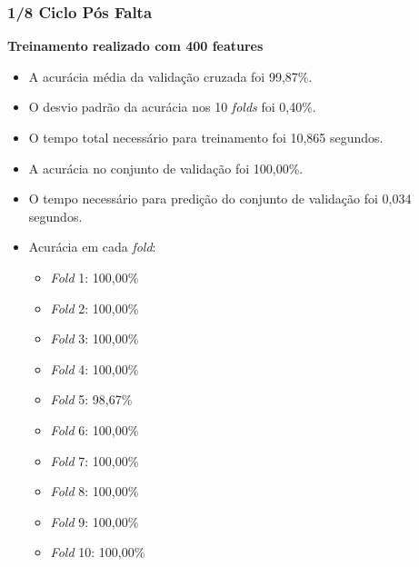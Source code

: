 \subsubsection{1/8 Ciclo Pós Falta}
\textbf{Treinamento realizado com 400 features}
\begin{itemize}
    \item A acurácia média da validação cruzada foi 99,87\%.
    \item O desvio padrão da acurácia nos 10 \textit{folds} foi 0,40\%.
    \item O tempo total necessário para treinamento foi 10,865 segundos.
    \item A acurácia no conjunto de validação foi 100,00\%.
    \item O tempo necessário para predição do conjunto de validação foi 0,034 segundos.
    \item Acurácia em cada \textit{fold}:
    \begin{itemize}
        \item \textit{Fold} 1: 100,00\%
        \item \textit{Fold} 2: 100,00\%
        \item \textit{Fold} 3: 100,00\%
        \item \textit{Fold} 4: 100,00\%
        \item \textit{Fold} 5: 98,67\%
        \item \textit{Fold} 6: 100,00\%
        \item \textit{Fold} 7: 100,00\%
        \item \textit{Fold} 8: 100,00\%
        \item \textit{Fold} 9: 100,00\%
        \item \textit{Fold} 10: 100,00\%
    \end{itemize}
\end{itemize}


